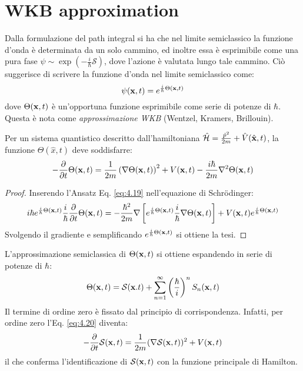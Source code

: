 \section{WKB approximation}

Dalla formulazione del path integral si ha che nel limite semiclassico la funzione d'onda è determinata da un solo cammino, ed inoltre essa è esprimibile come una pura fase $ \psi \sim \exp (-\frac{i}{\hbar} \mathcal{S}) $, dove l'azione è valutata lungo tale cammino. Ciò suggerisce di scrivere la funzione d'onda nel limite semiclassico come:
\begin{equation}
	\psi(\mathbf{x},t) = e^{\frac{i}{\hbar} \Theta(\mathbf{x},t)}
	\label{eq:4.19}
\end{equation}
dove $ \Theta(\mathbf{x},t) $ è un'opportuna funzione esprimibile come serie di potenze di $ \hbar $. Questa è nota come \textit{approssimazione WKB} (Wentzel, Kramers, Brillouin).

\begin{proposition}
	Per un sistema quantistico descritto dall'hamiltoniana $ \hat{\mathcal{H}} = \frac{\hat{p}^2}{2m} + \hat{V}(\hat{\mathbf{x}},t) $, la funzione $ \Theta(\hat{x},t) $ deve soddisfarre:
	\begin{equation}
		-\frac{\partial}{\partial t} \Theta(\mathbf{x},t) = \frac{1}{2m} \left( \nabla \Theta(\mathbf{x},t) \right)^2 + V(\mathbf{x},t) - \frac{i\hbar}{2m} \nabla^2 \Theta(\mathbf{x},t)
		\label{eq:4.20}
	\end{equation}
\end{proposition}
\begin{proof}
	Inserendo l'Ansatz Eq. \ref{eq:4.19} nell'equazione di Schrödinger:
	\begin{equation*}
		i\hbar e^{\frac{i}{\hbar}\Theta(\mathbf{x},t)} \frac{i}{\hbar} \frac{\partial}{\partial t} \Theta(\mathbf{x},t) = - \frac{\hbar^2}{2m} \nabla \left[ e^{\frac{i}{\hbar}\Theta(\mathbf{x},t)} \frac{i}{\hbar} \nabla \Theta(\mathbf{x},t) \right] + V(\mathbf{x},t) e^{\frac{i}{\hbar} \Theta(\mathbf{x},t)}
	\end{equation*}
	Svolgendo il gradiente e semplificando $ e^{\frac{i}{\hbar}\Theta(\mathbf{x},t)} $ si ottiene la tesi.
\end{proof}

L'approssimazione semiclassica di $ \Theta(\mathbf{x},t) $ si ottiene espandendo in serie di potenze di $ \hbar $:
\begin{equation}
	\Theta(\mathbf{x},t) = \mathcal{S}(\mathbf{x}.t) + \sum_{n = 1}^{\infty} \left( \frac{\hbar}{i} \right)^n S_n(\mathbf{x},t)
	\label{eq:4.21}
\end{equation}
Il termine di ordine zero è fissato dal principio di corrispondenza. Infatti, per ordine zero l'Eq. \ref{eq:4.20} diventa:
\begin{equation}
	- \frac{\partial}{\partial t} \mathcal{S}(\mathbf{x},t) = \frac{1}{2m} (\nabla \mathcal{S}(\mathbf{x},t))^2 + V(\mathbf{x},t)
	\label{eq:4.22}
\end{equation}
il che conferma l'identificazione di $ \mathcal{S}(\mathbf{x},t) $ con la funzione principale di Hamilton.


